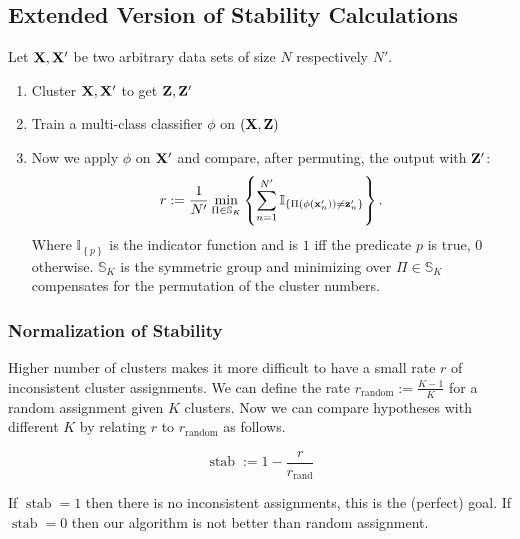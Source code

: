 \subsection{Extended Version of Stability Calculations}

Let \(\mathbf{X}, \mathbf{X}'\) be two arbitrary data sets of size \(N\) respectively \(N'\).
\begin{enumerate}
\item Cluster \(\mathbf{X}, \mathbf{X}'\) to get \(\mathbf{Z}, \mathbf{Z}'\)
\item Train a multi-class classifier \(\phi\) on \((\mathbf{X}, \mathbf{Z})\)
\item Now we apply \(\phi\) on \(\mathbf{X}'\) and compare, after permuting, the output with \(\mathbf{Z}'\): \[
r := \frac{1}{N'} \min_{\Pi \in \mathbb{S}_K} \left\lbrace \sum_{n=1}^{N'} \mathbb{I}_{\left\lbrace \Pi(\phi(\mathbf{x}'_n)) \neq \mathbf{z}'_n \right\rbrace} \right\rbrace.
\]
Where \(\mathbb{I}_{\left\lbrace p \right\rbrace}\) is the indicator function and is \(1\) iff the predicate \(p\) is true, \(0\) otherwise. \(\mathbb{S}_K\) is the symmetric group and minimizing over \(\Pi \in \mathbb{S}_K\) compensates for the permutation of the cluster numbers. 
\end{enumerate}

\subsubsection{Normalization of Stability}
Higher number of clusters makes it more difficult to have a small rate \(r\) of inconsistent cluster assignments. We can define the rate \(r_\text{random} := \frac{K-1}{K}\) for a random assignment given \(K\) clusters. Now we can compare hypotheses with different \(K\) by relating \(r\) to \(r_\text{random}\) as follows.

\begin{definition}[Stability]
\[
\operatorname{stab} := 1 - \frac{r}{r_\text{rand}}
\]

If \(\operatorname{stab} = 1\) then there is no inconsistent assignments, this is the (perfect) goal. If \(\operatorname{stab} = 0\) then our algorithm is not better than random assignment.
\end{definition}


